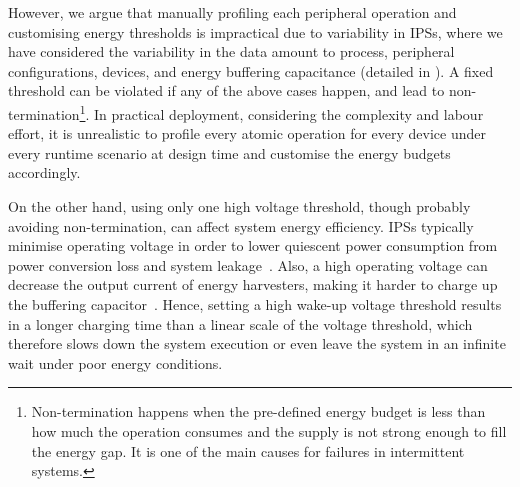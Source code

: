 
However, we argue that manually profiling each peripheral operation and customising energy thresholds is impractical due to variability in IPSs, where we have considered the variability in the data amount to process, peripheral configurations, devices, and energy buffering capacitance (detailed in ). 
A fixed threshold can be violated if any of the above cases happen, and lead to non-termination\footnote{Non-termination happens when the pre-defined energy budget is less than how much the operation consumes and the supply is not strong enough to fill the energy gap. It is one of the main causes for failures in intermittent systems. }.
In practical deployment, considering the complexity and labour effort, it is unrealistic to profile every atomic operation for every device under every runtime scenario at design time and customise the energy budgets accordingly. 



On the other hand, using only one high voltage threshold, though probably avoiding non-termination, can affect system energy efficiency. 
IPSs typically minimise operating voltage in order to lower quiescent power consumption from power conversion loss and system leakage~\cite{gomez2016dynamic}. 
Also, a high operating voltage can decrease the output current of energy harvesters, making it harder to charge up the buffering capacitor~\cite{pan2017maximize}.
Hence, setting a high wake-up voltage threshold results in a longer charging time than a linear scale of the voltage threshold, which therefore slows down the system execution or even leave the system in an infinite wait under poor energy conditions.


